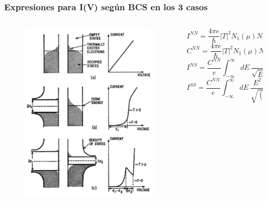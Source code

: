 \begin{frame}
\frametitle{Expresiones para I(V) seg\'un BCS en los 3 casos}

\begin{columns}
\begin{column}{0.35\textwidth}
	\begin{figure}[!h] \label{fermi_levels}
	\includegraphics[width=\textwidth]{fermi_levels}
	\end{figure}
\end{column}
\begin{column}{0.65\textwidth}
\begin{flushleft}
	\begin{equation*}\label{inn}
		I^{NN} = \frac{4\pi e}{\hbar} |T|^2 N_1(\mu)N_2(\mu) eV
	\end{equation*}
	\begin{equation*}\label{cnn}
		C^{NN} = \frac{4\pi e}{\hbar} |T|^2 N_1(\mu)N_2(\mu) e
	\end{equation*}
\vspace{0.3cm}
	\begin{equation*}\label{ins}
		I^{NS} = \frac{C^{NN}}{e} \int_{-\infty}^{\infty} dE\ \frac{|E|}{\sqrt{E^2-\Delta^2}} [f(E-eV)-f(E)]
	\end{equation*}
\vspace{0.4cm}	
	\begin{equation*}\label{iss}
		I^{SS} = \frac{C^{NN}}{e} \int_{-\infty}^{\infty} dE\ 
		\frac{E^2\ [f(E-eV)-f(E)]}{\sqrt{(E^2-\Delta_1 ^2)}\sqrt{(E^2-\Delta_2 ^2)}}
	\end{equation*}
\end{flushleft}
\end{column}
\end{columns}


\end{frame}
